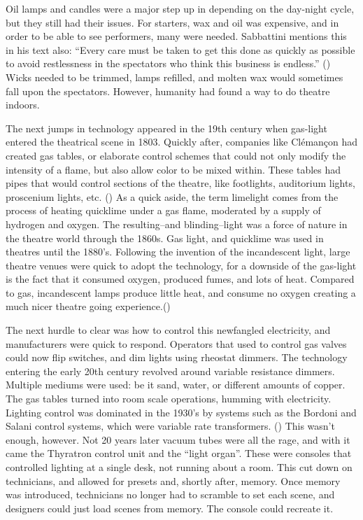 \documentclass[
    12pt,
    twoside,
    bibstyle=chicago,
    headerstyle=uppercase,
	bibfile=thesis.bib
]{reedthesis}
\begin{document}
Oil lamps and candles were a major step up in depending on the day-night cycle, but they still had their issues. For starters, wax and oil was expensive, and in order to be able to see performers, many were needed. Sabbattini mentions this in his text also: “Every care must be taken to get this done as quickly as possible to avoid restlessness in the spectators who think this business is endless.” (\autocite{internet_archive_renaissance_1958}) Wicks needed to be trimmed, lamps refilled, and molten wax would sometimes fall upon the spectators. However, humanity had found a way to do theatre indoors.

The next jumps in technology appeared in the 19th century when gas-light entered the theatrical scene in 1803. Quickly after, companies like Clémançon had created gas tables, or elaborate control schemes that could not only modify the intensity of a flame, but also allow color to be mixed within. These tables had pipes that would control sections of the theatre, like footlights, auditorium lights, proscenium lights, etc. (\autocite{pilbrow_stage_1997}) As a quick aside, the term limelight comes from the process of heating quicklime under a gas flame, moderated by a supply of hydrogen and oxygen. The resulting–and blinding–light was a force of nature in the theatre world through the 1860s. Gas light, and quicklime was used in theatres until the 1880's. Following the invention of the incandescent light, large theatre venues were quick to adopt the technology, for a downside of the gas-light is the fact that it consumed oxygen, produced fumes, and lots of heat. Compared to gas, incandescent lamps produce little heat, and consume no oxygen creating a much nicer theatre going experience.(\autocite{wild_brief_2015})

The next hurdle to clear was how to control this newfangled electricity, and manufacturers were quick to respond. Operators that used to control gas valves could now flip switches, and dim lights using rheostat dimmers. The technology entering the early 20th century revolved around variable resistance dimmers. Multiple mediums were used: be it sand, water, or different amounts of copper. The gas tables turned into room scale operations, humming with electricity. Lighting control was dominated in the 1930's by systems such as the Bordoni and Salani control systems, which were variable rate transformers. (\autocite{keller_light_2006})
This wasn't enough, however. Not 20 years later vacuum tubes were all the rage, and with it came the Thyratron control unit and the “light organ”. These were consoles that controlled lighting at a single desk, not running about a room. This cut down on technicians, and allowed for presets and, shortly after, memory. Once memory was introduced, technicians no longer had to scramble to set each scene, and designers could just load scenes from memory. The console could recreate it.
\end{document}
